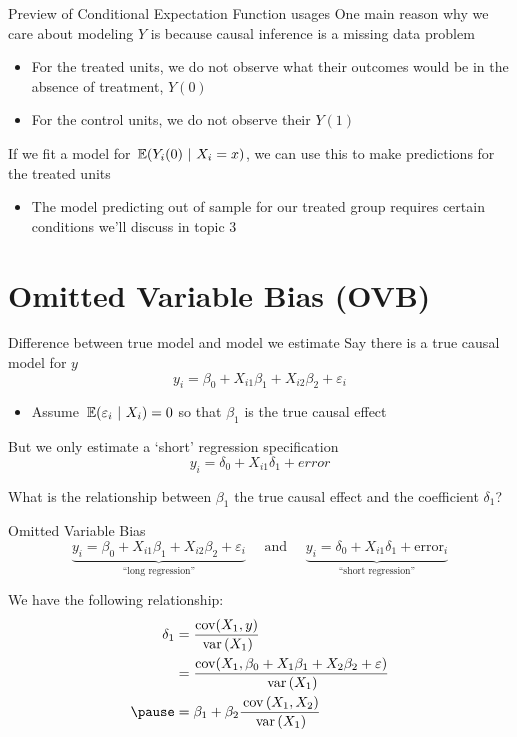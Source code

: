 \documentclass[aspectratio=169,t,11pt,table]{beamer}
\begin{document}
\begin{frame}{Preview of Conditional Expectation Function usages}
  One main reason why we care about modeling $Y$ is because causal inference is a missing data problem
  \begin{itemize}
    \item For the treated units, we do not observe what their outcomes would be in the absence of treatment, $Y(0)$
    \item For the control units, we do not observe their $Y(1)$
  \end{itemize}

  \pause
  \bigskip
  If we fit a model for $\expec{Y_i(0)}{X_i = x}$, we can use this to make predictions for the treated units 
  
  \pause
  \begin{itemize}
    \item The model predicting out of sample for our treated group requires certain conditions we'll discuss in topic 3
  \end{itemize}
\end{frame}


\section{Omitted Variable Bias (OVB)}

\begin{frame}{Difference between true model and model we estimate}
  Say there is a true causal model for $y$
  $$
    y_i = \beta_0 + X_{i1} \beta_1 + X_{i2} \beta_2 + \varepsilon_i
  $$
  \begin{itemize}
    \item Assume $\expec{\varepsilon_i}{X_i} = 0$ so that $\beta_1$ is the true causal effect
  \end{itemize}
  
  \pause
  \bigskip
  But we only estimate a `short' regression specification
  $$
    y_i = \delta_0 + X_{i1} \delta_1 + error
  $$

  \bigskip
  What is the relationship between $\beta_1$ the true causal effect and the coefficient $\delta_1$?
\end{frame}

\begin{frame}{Omitted Variable Bias}
  \vspace*{-\bigskipamount}
  $$
    \underbrace{y_i = \beta_0 + X_{i1} \beta_1 + X_{i2} \beta_2 + \varepsilon_i}_{\text{``long regression''}} \quad\text{ and }\quad \underbrace{y_i = \delta_0 + X_{i1} \delta_1 + \text{error}_i}_{\text{``short regression''}}
  $$

  \bigskip
  We have the following relationship:
  \begin{align*}
    \delta_1 
    &= \frac{\cov(X_1, y)}{\var{X_1}} \\
    &= \frac{\cov(X_1, \beta_0 + X_{1} \beta_1 + X_{2} \beta_2 + \varepsilon)}{\var{X_1}} \\ \pause
    &= \beta_1 + \beta_2 \frac{\cov{X_1, X_2}}{\var{X_1}} 
  \end{align*}
\end{frame}
\end{document}
